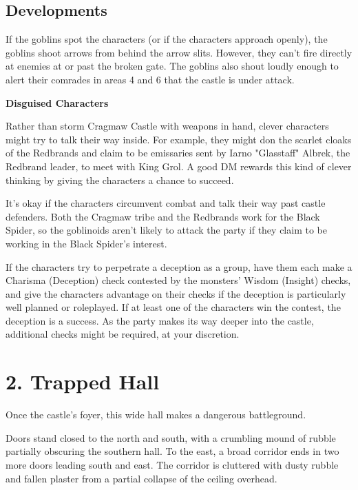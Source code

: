 \documentclass[10pt,a4paper,twoside,bg=print,twocolumn,openany,nodeprecatedcode]{dndbook}
\begin{document}
\subsection{Developments}
If the goblins spot the characters (or if the characters approach openly), the goblins shoot arrows from behind the arrow slits. However, they can't fire directly at enemies at or past the broken gate. The goblins also shout loudly enough to alert their comrades in areas 4 and 6 that the castle is under attack.

\textbf{Disguised Characters}

Rather than storm Cragmaw Castle with weapons in hand, clever characters might try to talk their way inside. For example, they might don the scarlet cloaks of the Redbrands and claim to be emissaries sent by Iarno "Glasstaff" Albrek, the Redbrand leader, to meet with King Grol. A good DM rewards this kind of clever thinking by giving the characters a chance to succeed.

It's okay if the characters circumvent combat and talk their way past castle defenders. Both the Cragmaw tribe and the Redbrands work for the Black Spider, so the goblinoids aren't likely to attack the party if they claim to be working in the Black Spider's interest.

If the characters try to perpetrate a deception as a group, have them each make a Charisma (Deception) check contested by the monsters' Wisdom (Insight) checks, and give the characters advantage on their checks if the deception is particularly well planned or roleplayed. If at least one of the characters win the contest, the deception is a success. As the party makes its way deeper into the castle, additional checks might be required, at your discretion.

\section{2. Trapped Hall}
Once the castle's foyer, this wide hall makes a dangerous battleground.

\begin{DndReadAloud}{}
Doors stand closed to the north and south, with a crumbling mound of rubble partially obscuring the southern hall. To the east, a broad corridor ends in two more doors leading south and east. The corridor is cluttered with dusty rubble and fallen plaster from a partial collapse of the ceiling overhead.

\end{DndReadAloud}
\end{document}
